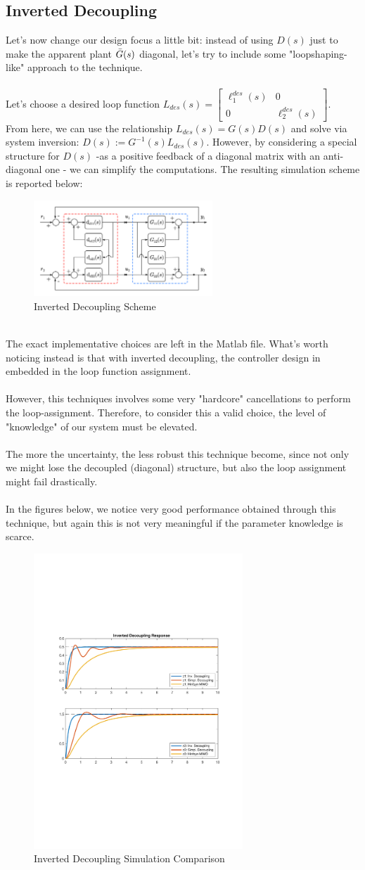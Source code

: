 \documentclass[a4paper, 12pt]{article}
\def\FigureTen{\centering\includegraphics[width=0.6\textwidth]{Figures/fig10.pdf}}
\def\FigureEleven{\centering\includegraphics[width=0.7\textwidth]{Figures/fig11.pdf}}
\begin{document}
\subsection{Inverted Decoupling}
Let's now change our design focus a little bit: instead of using $D(s)$ just to make the apparent plant $\Bar{G}(s)$ diagonal, let's try to include some "loopshaping-like" approach to the technique.
\\\\
Let's choose a desired loop function $L_{des}(s) = \begin{bmatrix}
\ell_1^{des}(s) & 0\\
0 & \ell_2^{des}(s)
\end{bmatrix}$.
\\From here, we can use the relationship $L_{des}(s) = G(s)D(s)$ and solve via system inversion: $D(s) := G^{-1}(s)L_{des}(s)$. However, by considering a special structure for $D(s)$ -as a positive feedback of a diagonal matrix with an anti-diagonal one - we can simplify the computations. 
The resulting simulation scheme is reported below:
\begin{figure}[h!]
    \FigureTen
    \caption{Inverted Decoupling Scheme}
    \label{fig:fig10}
\end{figure}
\\The exact implementative choices are left in the Matlab file. What's worth noticing instead is that with inverted decoupling, the controller design in embedded in the loop function assignment. 
\\
\\However, this techniques involves some very "hardcore" cancellations to perform the loop-assignment. Therefore, to consider this a valid choice, the level of "knowledge" of our system must be elevated.
\\\\The more the uncertainty, the less robust this technique become, since not only we might lose the decoupled (diagonal) structure, but also the loop assignment might fail drastically.
\\\\
In the figures below, we notice very good performance obtained through this technique, but again this is not very meaningful if the parameter knowledge is scarce.
\begin{figure}[h!]
    \FigureEleven
    \caption{Inverted Decoupling Simulation Comparison}
    \label{fig:fig11}
\end{figure}
\end{document}
